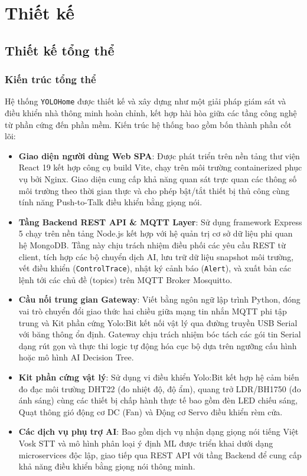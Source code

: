 \section{Thiết kế}


\subsection{Thiết kế tổng thể}


\subsubsection{Kiến trúc tổng thể}
Hệ thống \texttt{YOLOHome} được thiết kế và xây dựng như một giải pháp giám sát và điều khiển nhà thông minh hoàn chỉnh, kết hợp hài hòa giữa các tầng công nghệ từ phần cứng đến phần mềm. Kiến trúc hệ thống bao gồm bốn thành phần cốt lõi:
\begin{itemize}
    \item \textbf{Giao diện người dùng Web SPA}: Được phát triển trên nền tảng thư viện React 19 kết hợp công cụ build Vite, chạy trên môi trường containerized phục vụ bởi Nginx. Giao diện cung cấp khả năng quan sát trực quan các thông số môi trường theo thời gian thực và cho phép bật/tắt thiết bị thủ công cùng tính năng Push-to-Talk điều khiển bằng giọng nói.
    \item \textbf{Tầng Backend REST API \& MQTT Layer}: Sử dụng framework Express 5 chạy trên nền tảng Node.js kết hợp với hệ quản trị cơ sở dữ liệu phi quan hệ MongoDB. Tầng này chịu trách nhiệm điều phối các yêu cầu REST từ client, tích hợp các bộ chuyển dịch AI, lưu trữ dữ liệu snapshot môi trường, vết điều khiển (\texttt{ControlTrace}), nhật ký cảnh báo (\texttt{Alert}), và xuất bản các lệnh tới các chủ đề (topics) trên MQTT Broker Mosquitto.
    \item \textbf{Cầu nối trung gian Gateway}: Viết bằng ngôn ngữ lập trình Python, đóng vai trò chuyển đổi giao thức hai chiều giữa mạng tin nhắn MQTT phi tập trung và Kit phần cứng Yolo:Bit kết nối vật lý qua đường truyền USB Serial với băng thông ổn định. Gateway chịu trách nhiệm bóc tách các gói tin Serial dạng rút gọn và thực thi logic tự động hóa cục bộ dựa trên ngưỡng cấu hình hoặc mô hình AI Decision Tree.
    \item \textbf{Kit phần cứng vật lý}: Sử dụng vi điều khiển Yolo:Bit kết hợp hệ cảm biến đo đạc môi trường DHT22 (đo nhiệt độ, độ ẩm), quang trở LDR/BH1750 (đo ánh sáng) cùng các thiết bị chấp hành thực tế bao gồm đèn LED chiếu sáng, Quạt thông gió động cơ DC (Fan) và Động cơ Servo điều khiển rèm cửa.
    \item \textbf{Các dịch vụ phụ trợ AI}: Bao gồm dịch vụ nhận dạng giọng nói tiếng Việt Vosk STT và mô hình phân loại ý định ML được triển khai dưới dạng microservices độc lập, giao tiếp qua REST API với tầng Backend để cung cấp khả năng điều khiển bằng giọng nói thông minh.
\end{itemize}

